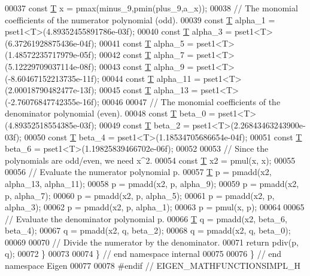 \begin{DoxyCode}
00037   \textcolor{keyword}{const} \hyperlink{group___sparse_core___module_class_eigen_1_1_triplet}{T} x = pmax(minus\_9,pmin(plus\_9,a\_x));
00038   \textcolor{comment}{// The monomial coefficients of the numerator polynomial (odd).}
00039   \textcolor{keyword}{const} \hyperlink{group___sparse_core___module_class_eigen_1_1_triplet}{T} alpha\_1 = pset1<T>(4.89352455891786e-03f);
00040   \textcolor{keyword}{const} \hyperlink{group___sparse_core___module_class_eigen_1_1_triplet}{T} alpha\_3 = pset1<T>(6.37261928875436e-04f);
00041   \textcolor{keyword}{const} \hyperlink{group___sparse_core___module_class_eigen_1_1_triplet}{T} alpha\_5 = pset1<T>(1.48572235717979e-05f);
00042   \textcolor{keyword}{const} \hyperlink{group___sparse_core___module_class_eigen_1_1_triplet}{T} alpha\_7 = pset1<T>(5.12229709037114e-08f);
00043   \textcolor{keyword}{const} \hyperlink{group___sparse_core___module_class_eigen_1_1_triplet}{T} alpha\_9 = pset1<T>(-8.60467152213735e-11f);
00044   \textcolor{keyword}{const} \hyperlink{group___sparse_core___module_class_eigen_1_1_triplet}{T} alpha\_11 = pset1<T>(2.00018790482477e-13f);
00045   \textcolor{keyword}{const} \hyperlink{group___sparse_core___module_class_eigen_1_1_triplet}{T} alpha\_13 = pset1<T>(-2.76076847742355e-16f);
00046 
00047   \textcolor{comment}{// The monomial coefficients of the denominator polynomial (even).}
00048   \textcolor{keyword}{const} \hyperlink{group___sparse_core___module_class_eigen_1_1_triplet}{T} beta\_0 = pset1<T>(4.89352518554385e-03f);
00049   \textcolor{keyword}{const} \hyperlink{group___sparse_core___module_class_eigen_1_1_triplet}{T} beta\_2 = pset1<T>(2.26843463243900e-03f);
00050   \textcolor{keyword}{const} \hyperlink{group___sparse_core___module_class_eigen_1_1_triplet}{T} beta\_4 = pset1<T>(1.18534705686654e-04f);
00051   \textcolor{keyword}{const} \hyperlink{group___sparse_core___module_class_eigen_1_1_triplet}{T} beta\_6 = pset1<T>(1.19825839466702e-06f);
00052 
00053   \textcolor{comment}{// Since the polynomials are odd/even, we need x^2.}
00054   \textcolor{keyword}{const} \hyperlink{group___sparse_core___module_class_eigen_1_1_triplet}{T} x2 = pmul(x, x);
00055 
00056   \textcolor{comment}{// Evaluate the numerator polynomial p.}
00057   \hyperlink{group___sparse_core___module_class_eigen_1_1_triplet}{T} p = pmadd(x2, alpha\_13, alpha\_11);
00058   p = pmadd(x2, p, alpha\_9);
00059   p = pmadd(x2, p, alpha\_7);
00060   p = pmadd(x2, p, alpha\_5);
00061   p = pmadd(x2, p, alpha\_3);
00062   p = pmadd(x2, p, alpha\_1);
00063   p = pmul(x, p);
00064 
00065   \textcolor{comment}{// Evaluate the denominator polynomial p.}
00066   \hyperlink{group___sparse_core___module_class_eigen_1_1_triplet}{T} q = pmadd(x2, beta\_6, beta\_4);
00067   q = pmadd(x2, q, beta\_2);
00068   q = pmadd(x2, q, beta\_0);
00069 
00070   \textcolor{comment}{// Divide the numerator by the denominator.}
00071   \textcolor{keywordflow}{return} pdiv(p, q);
00072 \}
00073 
00074 \} \textcolor{comment}{// end namespace internal}
00075 
00076 \} \textcolor{comment}{// end namespace Eigen}
00077 
00078 \textcolor{preprocessor}{#endif // EIGEN\_MATHFUNCTIONSIMPL\_H}
\end{DoxyCode}
